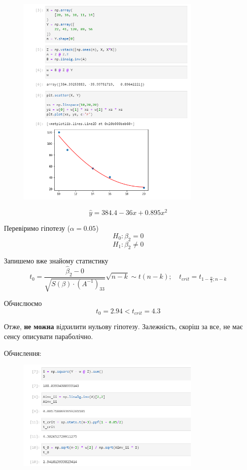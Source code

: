 \documentclass[11pt, a4paper]{article} %
\begin{document}
\begin{figure}[h]
    \centering
    \includegraphics[width=0.8\textwidth]{task9.png}
\end{figure}

$$\hat y = 384.4 - 36 x + 0.895 x^2$$

Перевіримо гіпотезу ($\alpha=0.05$)
$$H_0 : \beta_2 = 0$$
$$H_1 : \beta_2 \ne 0$$

Запишемо вже знайому статистику
$$t_0 = \frac{\hat \beta_2 - 0}{\sqrt{S(\beta) \cdot \left(A^{-1}\right)_{33}}}\sqrt{n-k} \sim t(n-k); \quad t_{crit} = t_{1-\frac{\alpha}{2}; n-k}$$

Обчислюємо
$$t_0 = 2.94 < t_{crit} = 4.3$$

Отже, \textbf{не можна} відхилити нульову гіпотезу.
Залежність, скоріш за все, не має сенсу описувати параболічно.

Обчислення:
\begin{figure}[h]
    \centering
    \includegraphics[width=0.8\textwidth]{task9.1.png}
\end{figure}
\end{document}
